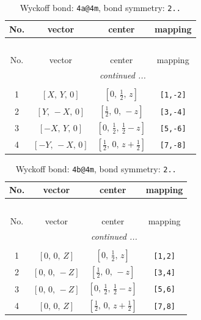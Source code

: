 \documentclass[fleqn,8pt]{jsarticle}
\begin{document}
\begin{longtable}{cccc}
\caption{Wyckoff bond: {\tt 4a@4m}, bond symmetry: {\tt 2..}}
 \\
 \hline \hline
No. & vector & center & mapping \\ \hline \endfirsthead

\multicolumn{3}{l}{\tablename\ \thetable{}} \\
 \hline \hline
No. & vector & center & mapping \\ \hline \endhead

 \hline \hline
\multicolumn{3}{r}{\footnotesize\it continued ...} \\ \endfoot

 \hline \hline
\multicolumn{3}{r}{} \\ \endlastfoot

1 & $\left[ X,\, Y,\, 0 \right]$ & $\left[ 0,\, \frac{1}{2},\, z \right]$ & {\tt [1,-2]} \\ \hline
2 & $\left[ Y,\, - X,\, 0 \right]$ & $\left[ \frac{1}{2},\, 0,\, - z \right]$ & {\tt [3,-4]} \\ \hline
3 & $\left[ - X,\, Y,\, 0 \right]$ & $\left[ 0,\, \frac{1}{2},\, \frac{1}{2} - z \right]$ & {\tt [5,-6]} \\ \hline
4 & $\left[ - Y,\, - X,\, 0 \right]$ & $\left[ \frac{1}{2},\, 0,\, z + \frac{1}{2} \right]$ & {\tt [7,-8]} \\
\end{longtable}
\renewcommand{\arraystretch}{1.2}
\begin{longtable}{cccc}
\caption{Wyckoff bond: {\tt 4b@4m}, bond symmetry: {\tt 2..}}
 \\
 \hline \hline
No. & vector & center & mapping \\ \hline \endfirsthead

\multicolumn{3}{l}{\tablename\ \thetable{}} \\
 \hline \hline
No. & vector & center & mapping \\ \hline \endhead

 \hline \hline
\multicolumn{3}{r}{\footnotesize\it continued ...} \\ \endfoot

 \hline \hline
\multicolumn{3}{r}{} \\ \endlastfoot

1 & $\left[ 0,\, 0,\, Z \right]$ & $\left[ 0,\, \frac{1}{2},\, z \right]$ & {\tt [1,2]} \\ \hline
2 & $\left[ 0,\, 0,\, - Z \right]$ & $\left[ \frac{1}{2},\, 0,\, - z \right]$ & {\tt [3,4]} \\ \hline
3 & $\left[ 0,\, 0,\, - Z \right]$ & $\left[ 0,\, \frac{1}{2},\, \frac{1}{2} - z \right]$ & {\tt [5,6]} \\ \hline
4 & $\left[ 0,\, 0,\, Z \right]$ & $\left[ \frac{1}{2},\, 0,\, z + \frac{1}{2} \right]$ & {\tt [7,8]} \\
\end{longtable}
\end{document}
